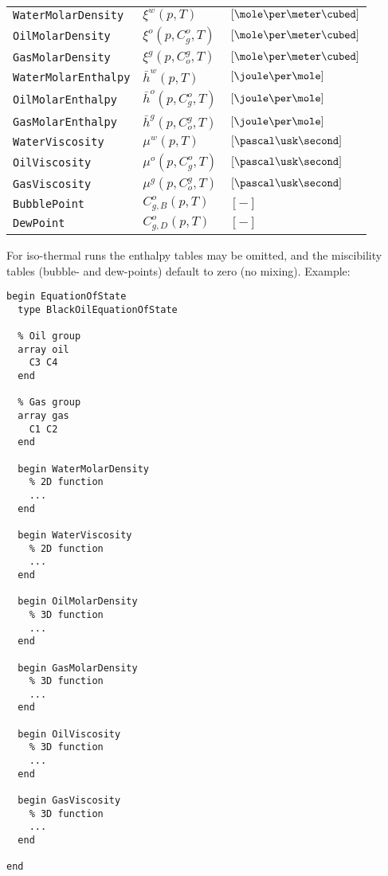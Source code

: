 \begin{tabular}{lll}
  \texttt{WaterMolarDensity} & $\xi^w(p,T)$ &
  $[\mole\per\meter\cubed]$ \\
  \texttt{OilMolarDensity} & $\xi^o\left(p,C_g^o,T\right)$ &
  $[\mole\per\meter\cubed]$ \\
  \texttt{GasMolarDensity} & $\xi^g\left(p,C_o^g,T\right)$ &
  $[\mole\per\meter\cubed]$ \\
  \texttt{WaterMolarEnthalpy} & $\bar h^w(p,T)$ &
  $[\joule\per\mole]$ \\
  \texttt{OilMolarEnthalpy} & $\bar h^o\left(p,C_g^o,T\right)$ &
  $[\joule\per\mole]$ \\
  \texttt{GasMolarEnthalpy} & $\bar h^g\left(p,C_o^g,T\right)$ &
  $[\joule\per\mole]$ \\
  \texttt{WaterViscosity} & $\mu^w(p,T)$ &
  $[\pascal\usk\second]$ \\
  \texttt{OilViscosity} & $\mu^o\left(p,C_g^o,T\right)$ &
  $[\pascal\usk\second]$ \\
  \texttt{GasViscosity} & $\mu^g\left(p,C_o^g,T\right)$ &
  $[\pascal\usk\second]$ \\
  \texttt{BubblePoint} & $C_{g,B}^o(p,T)$ & $\left[-\right]$ \\
  \texttt{DewPoint} & $C_{g,D}^o(p,T)$ & $\left[-\right]$
\end{tabular}

For iso-thermal runs the enthalpy tables may be omitted, and the
miscibility tables (bubble- and dew-points) default to zero (no
mixing). Example:

\begin{verbatim}
begin EquationOfState
  type BlackOilEquationOfState

  % Oil group
  array oil
    C3 C4
  end

  % Gas group
  array gas
    C1 C2
  end

  begin WaterMolarDensity
    % 2D function
    ...
  end

  begin WaterViscosity
    % 2D function
    ...
  end

  begin OilMolarDensity
    % 3D function
    ...
  end

  begin GasMolarDensity
    % 3D function
    ...
  end

  begin OilViscosity
    % 3D function
    ...
  end

  begin GasViscosity
    % 3D function
    ...
  end

end
\end{verbatim}

